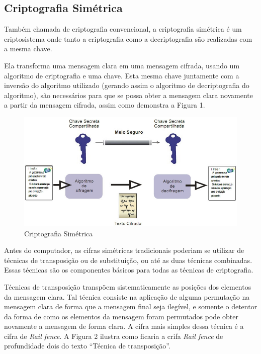 \subsection{Criptografia Simétrica}
\label{subsec:criptografiasync}
Também chamada de criptografia convencional, a criptografia simétrica é um criptosistema onde tanto a criptografia como a decriptografia são realizadas com a mesma chave.

Ela transforma uma mensagem clara em uma mensagem cifrada, usando um algoritmo de criptografia e uma chave. Esta mesma chave juntamente com a inversão do algoritmo utilizado (gerando assim o algoritmo de decriptografia do algoritmo), são necessários para que se possa obter a mensagem clara novamente a partir da mensagem cifrada, assim como demonstra a Figura 1.

\begin{figure}[H]
    \centering
    \caption{Criptografia Simétrica}
    \includegraphics[width=.8\linewidth]{Figuras/CripSimetrica.jpg}
\end{figure}

Antes do computador, as cifras simétricas tradicionais poderiam se utilizar de técnicas de transposição ou de substituição, ou até as duas técnicas combinadas. Essas técnicas são os componentes básicos para todas as técnicas de criptografia.

Técnicas de transposição transpõem sistematicamente as posições dos elementos da mensagem clara. Tal técnica consiste na aplicação de alguma permutação na mensagem clara de forma que a mensagem final seja ilegível, e somente o detentor da forma de como os elementos da mensagem foram permutados pode obter novamente a mensagem de forma clara. A cifra mais simples dessa técnica é a cifra de \textit{Rail fence}. A Figura 2 ilustra como ficaria a crifa \textit{Rail fence} de profundidade dois do texto “Técnica de transposição”.


